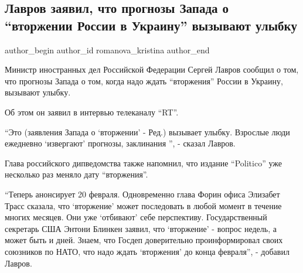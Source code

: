  
 
 
 
 
 
\subsection{Лавров заявил, что прогнозы Запада о \enquote{вторжении России в Украину} вызывают улыбку}
\label{sec:18_02_2022.stz.news.ua.strana.2.lavrov_vtorzhenie_ulybka}
 
\ifcmt
 author_begin
   author_id romanova_kristina
 author_end
\fi

Министр иностранных дел Российской Федерации Сергей Лавров сообщил о том, что
прогнозы Запада о том, когда надо ждать \enquote{вторжения} России в Украину,
вызывают улыбку.

Об этом он заявил в интервью телеканалу \enquote{RT}.

\enquote{Это (заявления Запада о \enquote{вторжении} - Ред.) вызывает улыбку.
Взрослые люди ежедневно \enquote{извергают} прогнозы, заклинания }, - сказал
Лавров. 


Глава российского дипведомства также напомнил, что издание \enquote{Politico}
уже несколько раз меняло дату \enquote{вторжения}.

\enquote{Теперь анонсирует 20 февраля. Одновременно глава Форин офиса Элизабет
Трасс сказала, что \enquote{вторжение} может последовать в любой момент в
течение многих месяцев. Они уже \enquote{отбивают} себе перспективу.
Государственный секретарь США Энтони Блинкен заявил, что \enquote{вторжение} -
вопрос недель, а может быть и дней.  Знаем, что Госдеп доверительно
проинформировал своих союзников по НАТО, что надо ждать \enquote{вторжения} до
конца февраля}, - добавил Лавров.

